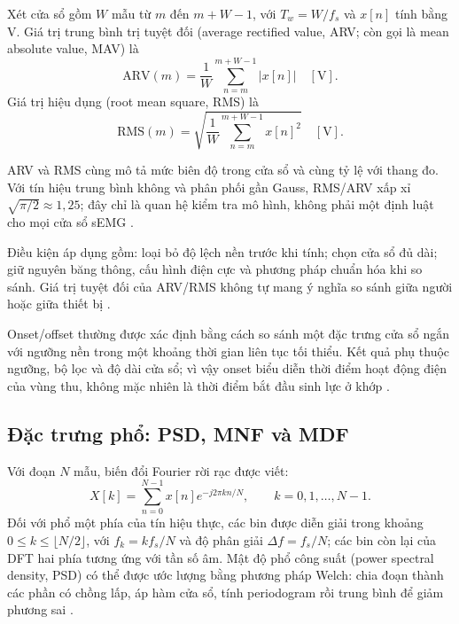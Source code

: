 Xét cửa sổ gồm $W$ mẫu từ $m$ đến $m+W-1$, với $T_w=W/f_s$ và $x[n]$ tính
bằng V. Giá trị trung bình trị tuyệt đối (average rectified value, ARV;
còn gọi là mean absolute value, MAV) là
\begin{equation}
\label{eq:arv}
\mathrm{ARV}(m)=\frac{1}{W}\sum_{n=m}^{m+W-1}|x[n]|\quad[\mathrm{V}].
\end{equation}
Giá trị hiệu dụng (root mean square, RMS) là
\begin{equation}
\label{eq:rms}
\mathrm{RMS}(m)=
\sqrt{\frac{1}{W}\sum_{n=m}^{m+W-1}x[n]^2}\quad[\mathrm{V}].
\end{equation}

ARV và RMS cùng mô tả mức biên độ trong cửa sổ và cùng tỷ lệ với thang
đo. Với tín hiệu trung bình không và phân phối gần Gauss, RMS/ARV xấp xỉ
$\sqrt{\pi/2}\approx1{,}25$; đây chỉ là quan hệ kiểm tra mô hình, không
phải một định luật cho mọi cửa sổ sEMG
\cite{merletti1999standards,mcmanus2020analysis}.

Điều kiện áp dụng gồm: loại bỏ độ lệch nền trước khi tính; chọn cửa sổ đủ
dài; giữ nguyên băng thông, cấu hình điện cực và phương pháp chuẩn hóa khi
so sánh. Giá trị tuyệt đối của ARV/RMS không tự mang ý nghĩa so sánh giữa
người hoặc giữa thiết bị \cite{merletti1999standards,besomi2020consensus}.

Onset/offset thường được xác định bằng cách so sánh một đặc trưng cửa sổ
ngắn với ngưỡng nền trong một khoảng thời gian liên tục tối thiểu. Kết quả
phụ thuộc ngưỡng, bộ lọc và độ dài cửa sổ; vì vậy onset biểu diễn thời điểm
hoạt động điện của vùng thu, không mặc nhiên là thời điểm bắt đầu sinh lực
ở khớp \cite{mcmanus2020analysis,boyer2023reducing}.

\subsection{Đặc trưng phổ: PSD, MNF và MDF}
\label{sec:spectral-features}

Với đoạn $N$ mẫu, biến đổi Fourier rời rạc được viết:
\begin{equation}
\label{eq:dft}
X[k]=\sum_{n=0}^{N-1}x[n]e^{-j2\pi kn/N},\qquad
k=0,1,\ldots,N-1.
\end{equation}
Đối với phổ một phía của tín hiệu thực, các bin được diễn giải trong
khoảng $0\leq k\leq\lfloor N/2\rfloor$, với
$f_k=kf_s/N$ và độ phân giải $\Delta f=f_s/N$; các bin còn lại của DFT
hai phía tương ứng với tần số âm. Mật độ phổ công suất (power spectral
density, PSD) có thể được ước lượng bằng phương pháp Welch: chia đoạn
thành các phần có chồng lấp, áp hàm cửa sổ, tính periodogram rồi trung
bình để giảm phương sai \cite{muceli2024tutorial}.

